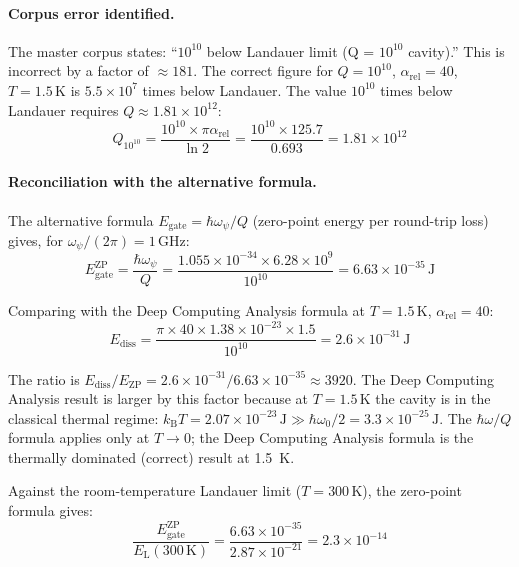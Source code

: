 \documentclass[11pt]{article}
\theoremstyle{definition}
\theoremstyle{remark}
\newcommand{\kB}{k_{\mathrm{B}}}
\newcommand{\EL}{E_{\mathrm{L}}}
\begin{document}
\paragraph{Corpus error identified.}
The master corpus states: ``$10^{10}$ below Landauer limit (Q = $10^{10}$ cavity).''
This is incorrect by a factor of $\approx 181$. The correct figure for
$Q = 10^{10}$, $\alpha_{\mathrm{rel}} = 40$, $T = 1.5\,\mathrm{K}$ is
$5.5 \times 10^7$ times below Landauer. The value $10^{10}$ times below
Landauer requires $Q \approx 1.81 \times 10^{12}$:
\begin{equation}
Q_{10^{10}} = \frac{10^{10} \times \pi\alpha_{\mathrm{rel}}}{\ln 2}
= \frac{10^{10} \times 125.7}{0.693}
= 1.81 \times 10^{12}
\end{equation}

\paragraph{Reconciliation with the alternative formula.}
The alternative formula $E_{\mathrm{gate}} = \hbar\omega_\psi/Q$ (zero-point
energy per round-trip loss) gives, for $\omega_\psi/(2\pi) = 1\,\mathrm{GHz}$:
\begin{equation}
E_{\mathrm{gate}}^{\mathrm{ZP}} = \frac{\hbar\omega_\psi}{Q}
= \frac{1.055\times 10^{-34} \times 6.28\times 10^9}{10^{10}}
= 6.63\times 10^{-35}\,\mathrm{J}
\end{equation}

Comparing with the Deep Computing Analysis formula at $T = 1.5\,\mathrm{K}$,
$\alpha_{\mathrm{rel}} = 40$:
\begin{equation}
E_{\mathrm{diss}} = \frac{\pi \times 40 \times 1.38\times 10^{-23} \times 1.5}{10^{10}}
= 2.6\times 10^{-31}\,\mathrm{J}
\end{equation}

The ratio is $E_{\mathrm{diss}} / E_{\mathrm{ZP}} = 2.6\times 10^{-31} /
6.63\times 10^{-35} \approx 3920$. The Deep Computing Analysis result
is larger by this factor because at $T = 1.5\,\mathrm{K}$ the cavity is
in the classical thermal regime: $\kB T = 2.07\times 10^{-23}\,\mathrm{J}
\gg \hbar\omega_0/2 = 3.3\times 10^{-25}\,\mathrm{J}$. The $\hbar\omega/Q$
formula applies only at $T \to 0$; the Deep Computing Analysis formula
is the thermally dominated (correct) result at 1.5~K.

Against the room-temperature Landauer limit ($T = 300\,\mathrm{K}$),
the zero-point formula gives:
\begin{equation}
\frac{E_{\mathrm{gate}}^{\mathrm{ZP}}}{\EL(300\,\mathrm{K})}
= \frac{6.63\times 10^{-35}}{2.87\times 10^{-21}}
= 2.3\times 10^{-14}
\end{equation}
\end{document}

